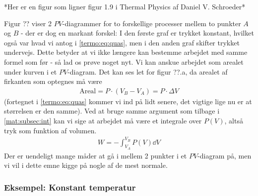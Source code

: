\documentclass[crop=false, class=memoir]{standalone}
\begin{document}
 *Her er en figur som ligner figur 1.9 i Thermal Physics af Daniel V. Schroeder*

Figur ?? viser 2 $PV$-diagrammer for to forskellige processer mellem to punkter $A$ og $B$ - der er dog en markant forskel: I den første graf er trykket konstant, hvilket også var hvad vi antog i \cref{termo:eq:quas}, men i den anden graf skifter trykket undervejs. Dette betyder at vi ikke længere kan bestemme arbejdet med samme formel som før - så lad os prøve noget nyt. Vi kan anskue arbejdet som arealet under kurven i et $PV$-diagram. Det kan ses let for figur ??.a, da arealet af firkanten som optegnes må være
\begin{align}
    \text{Areal} = P \cdot (V_B - V_A ) = P\cdot \Delta V
\end{align}
(fortegnet i \cref{termo:eq:quas} kommer vi ind på lidt senere, det vigtige lige nu er at størrelsen er den samme). Ved at bruge samme argument som tilbage i \cref{mat:subsec:int} kan vi sige at arbejdet må være et integrale over $P(V)$, altså tryk som funktion af volumen.
\begin{align}
    W = -\int_{V_A}^{V_B} P(V) \dd{V}
    \label{termo:eq:work}
\end{align}
Der er uendeligt mange måder at gå i mellem 2 punkter i et $PV$-diagram på, men vi vil i dette emne kigge på nogle af de mest normale.

\subsubsection{Eksempel: Konstant temperatur}
\end{document}
